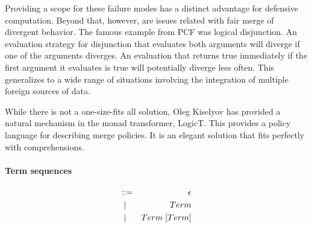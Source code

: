 Providing a scope for these failure modes has a distinct advantage for defensive computation. Beyond that, however, are issues related with fair merge of divergent behavior. The famous example from PCF was logical disjunction. An evaluation strategy for disjunction that evaluates both arguments will diverge if one of the arguments diverges. An evaluation that returns true immediately if the first argument it evaluates is true will potentially diverge less often. This generalizes to a wide range of situations involving the integration of multiple foreign sources of data. 

While there is not a one-size-fits all solution, Oleg Kiselyov has provided a natural mechanism in the monad transformer, LogicT. This provides a policy language for describing merge policies. It is an elegant solution that fits perfectly with comprehensions.

\paragraph{Term sequences}
\begin{eqnarray*}
  [Term] & \bc & \epsilon \\
  & \;\bm \; & Term \\
  & \;\bm \; & Term \; [Term]
\end{eqnarray*}

